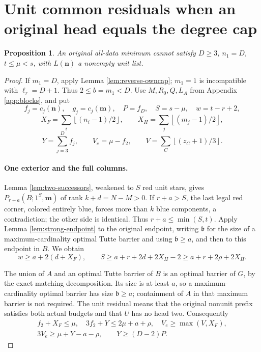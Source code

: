 \documentclass[11pt,a4paper]{article}
\newcommand{\nn}{\mathbf n}\newcommand{\mm}{\mathbf m}
\newcommand{\floor}[1]{\left\lfloor#1\right\rfloor}
\newtheorem{proposition}[theorem]{Proposition}
\theoremstyle{definition}
\begin{document}
\section{Unit common residuals when an original head equals the degree cap}\label{app:unit-side}
\begin{proposition}\label{prop:unit-single}
An original all-data minimum cannot satisfy
$D\ge3$, $n_1=D$, $t\le\mu<s$, with $L(\nn)$ a nonempty unit list.
\end{proposition}
\begin{proof}
If $m_1=D$, apply Lemma \ref{lem:reverse-owncap}; $m_1=1$ is incompatible with $\ell_r=D+1$.
Thus $2\le b=m_1<D$. Use $M,R_0,Q,L_A$ from Appendix \ref{app:blocks}, and put
\[
 f_j=c_j(\nn),\quad g_j=c_j(\mm),\quad P=f_D,\quad
 S=s-\mu,\quad w=t-r+2,
\]
\[
 X_F=\sum_i\floor{(n_i-1)/2},\qquad X_H=\sum_j\floor{(m_j-1)/2},
\]
\[
 Y=\sum_{j=3}^{D}f_j,\qquad V_e=\mu-f_2,\qquad
 V=\sum_C\floor{(z_C+1)/3}.
\]

\paragraph{One exterior and the full columns.}
Lemma \ref{lem:two-successors}, weakened to $S$ red unit stars, gives
$P_{r+a}(B;1^S,\mm)$ of rank $k+d=N-M>0$.
If $r+a>S$, the last legal red corner, colored entirely blue, forces more than $k$ blue components, a contradiction; the other side is identical.
Thus $r+a\le\min(S,t)$.
Apply Lemma \ref{lem:strong-endpoint} to the original endpoint, writing $\mathfrak b$ for the size of a maximum-cardinality optimal Tutte barrier and using $\mathfrak b\ge a$, and then to this endpoint in $B$. We obtain
\begin{equation}\label{eq:unit-guards}
 w\ge a+2(d+X_F),\qquad
 S\ge a+r+2d+2X_H-2\ge a+r+2\rho+2X_H.
\end{equation}

The union of $A$ and an optimal Tutte barrier of $B$ is an optimal barrier of $G$, by the exact matching decomposition. Its size is at least $a$, so a maximum-cardinality optimal barrier has size $\mathfrak b\ge a$; containment of $A$ in that maximum barrier is not required.
The unit residual means that the original nonunit prefix satisfies both actual budgets and that $U$ has no head two. Consequently
\begin{equation}\label{eq:unit-budgets}
\begin{gathered}
 f_2+X_F\le\mu,\quad 3f_2+Y\le2\mu+a+\rho,\quad
 V_e\ge\max(V,X_F),\\
 3V_e\ge\mu+Y-a-\rho,\qquad Y\ge(D-2)P.
\end{gathered}
\end{equation}


\end{proof}
\end{document}
